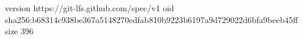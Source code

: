 version https://git-lfs.github.com/spec/v1
oid sha256:b68314c938be367a5148270edfab810b9223b6197a9d729022d6bfa9beeb45ff
size 396
